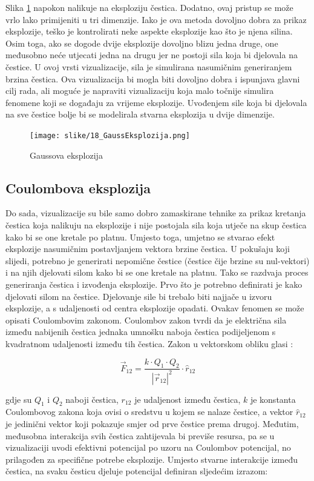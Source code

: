 \documentclass{foi}
\begin{document}
Slika \ref{fig:GaussEksplozija} napokon nalikuje na eksploziju čestica. Dodatno, ovaj pristup se može vrlo lako primijeniti u tri dimenzije. Iako je ova metoda dovoljno dobra za prikaz eksplozije, teško je kontrolirati neke aspekte eksplozije kao što je njena silina. Osim toga, ako se dogode dvije eksplozije dovoljno blizu jedna druge, one međusobno neće utjecati jedna na drugu jer ne postoji sila koja bi djelovala na čestice. U ovoj vrsti vizualizacije, sila je simulirana nasumičnim generiranjem brzina čestica. Ova vizualizacija bi mogla biti dovoljno dobra i ispunjava glavni cilj rada, ali moguće je napraviti vizualizaciju koja malo točnije simulira fenomene koji se događaju za vrijeme eksplozije. Uvođenjem sile koja bi djelovala na sve čestice bolje bi se modelirala stvarna eksplozija u dvije dimenzije.

\begin{figure}[H]
    \centering
    \texttt{[image: slike/18\_GaussEksplozija.png]}
    \captionsetup{justification=centering}
    \caption{Gaussova eksplozija}
\label{fig:GaussEksplozija}
\end{figure}


\subsection{Coulombova eksplozija}
Do sada, vizualizacije su bile samo dobro zamaskirane tehnike za prikaz kretanja čestica koja nalikuju na eksplozije i nije postojala sila koja utječe na skup čestica kako bi se one kretale po platnu. Umjesto toga, umjetno se stvarao efekt eksplozije nasumičnim postavljanjem vektora brzine čestica. U pokušaju koji slijedi, potrebno je generirati nepomične čestice (čestice čije brzine su nul-vektori) i na njih djelovati silom kako bi se one kretale na platnu. Tako se razdvaja proces generiranja čestica i izvođenja eksplozije. Prvo što je potrebno definirati je kako djelovati silom na čestice. Djelovanje sile bi trebalo biti najjače u izvoru eksplozije, a s udaljenosti od centra eksplozije opadati. Ovakav fenomen se može opisati Coulombovim zakonom. Coulombov zakon tvrdi da je električna sila između nabijenih čestica jednaka umnošku naboja čestica podijeljenom s kvadratnom udaljenosti između tih čestica. Zakon u vektorskom obliku glasi \parencite{ByjusCoulombsLaw}:

\[
\vec{F}_{12} = \frac{k \cdot Q_1 \cdot Q_2}{|\vec{r}_{12}|^2} \cdot \hat{r}_{12}
\]

gdje su $Q_1$ i $Q_2$ naboji čestica, $r_{12}$ je udaljenost između čestica, $k$ je konstanta Coulombovog zakona koja ovisi o sredstvu u kojem se nalaze čestice, a vektor $\hat{r}_{12}$ je jedinični vektor koji pokazuje smjer od prve čestice prema drugoj. Međutim, međusobna interakcija svih čestica zahtijevala bi previše resursa, pa se u vizualizaciji uvodi efektivni potencijal po uzoru na Coulombov potencijal, no prilagođen za specifične potrebe eksplozije. Umjesto stvarne interakcije između čestica, na svaku česticu djeluje potencijal definiran sljedećim izrazom:
\end{document}
